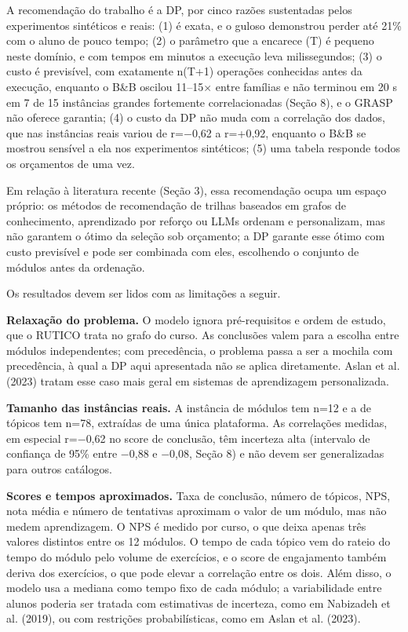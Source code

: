 \documentclass[12pt,a4paper]{article}
\newcommand{\secao}[1]{\par\vspace{1.2em}\noindent{\bfseries #1}\par\vspace{0.8em}\nopagebreak}
\begin{document}
A recomendação do trabalho é a DP, por cinco razões sustentadas pelos experimentos sintéticos e reais: (1) é exata, e o guloso demonstrou perder até 21\% com o aluno de pouco tempo; (2) o parâmetro que a encarece (T) é pequeno neste domínio, e com tempos em minutos a execução leva milissegundos; (3) o custo é previsível, com exatamente n(T+1) operações conhecidas antes da execução, enquanto o B\&B oscilou 11--15\ensuremath{\times} entre famílias e não terminou em 20 s em 7 de 15 instâncias grandes fortemente correlacionadas (Seção 8), e o GRASP não oferece garantia; (4) o custo da DP não muda com a correlação dos dados, que nas instâncias reais variou de r=\ensuremath{-}0,62 a r=+0,92, enquanto o B\&B se mostrou sensível a ela nos experimentos sintéticos; (5) uma tabela responde todos os orçamentos de uma vez.

Em relação à literatura recente (Seção 3), essa recomendação ocupa um espaço próprio: os métodos de recomendação de trilhas baseados em grafos de conhecimento, aprendizado por reforço ou LLMs ordenam e personalizam, mas não garantem o ótimo da seleção sob orçamento; a DP garante esse ótimo com custo previsível e pode ser combinada com eles, escolhendo o conjunto de módulos antes da ordenação.

\secao{10 LIMITAÇÕES}
Os resultados devem ser lidos com as limitações a seguir.

\textbf{Relaxação do problema.} O modelo ignora pré-requisitos e ordem de estudo, que o RUTICO trata no grafo do curso. As conclusões valem para a escolha entre módulos independentes; com precedência, o problema passa a ser a mochila com precedência, à qual a DP aqui apresentada não se aplica diretamente. Aslan et al. (2023) tratam esse caso mais geral em sistemas de aprendizagem personalizada.

\textbf{Tamanho das instâncias reais.} A instância de módulos tem n=12 e a de tópicos tem n=78, extraídas de uma única plataforma. As correlações medidas, em especial r=\ensuremath{-}0,62 no score de conclusão, têm incerteza alta (intervalo de confiança de 95\% entre \ensuremath{-}0,88 e \ensuremath{-}0,08, Seção 8) e não devem ser generalizadas para outros catálogos.

\textbf{Scores e tempos aproximados.} Taxa de conclusão, número de tópicos, NPS, nota média e número de tentativas aproximam o valor de um módulo, mas não medem aprendizagem. O NPS é medido por curso, o que deixa apenas três valores distintos entre os 12 módulos. O tempo de cada tópico vem do rateio do tempo do módulo pelo volume de exercícios, e o score de engajamento também deriva dos exercícios, o que pode elevar a correlação entre os dois. Além disso, o modelo usa a mediana como tempo fixo de cada módulo; a variabilidade entre alunos poderia ser tratada com estimativas de incerteza, como em Nabizadeh et al. (2019), ou com restrições probabilísticas, como em Aslan et al. (2023).
\end{document}
